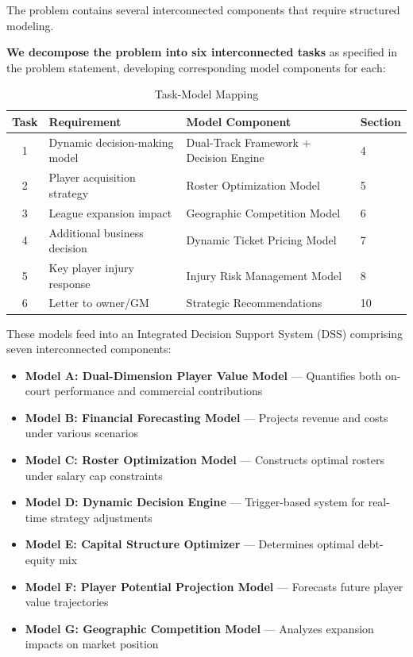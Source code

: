 \documentclass{mcmthesis}
\begin{document}
The problem contains several interconnected components that require structured modeling.

\textbf{We decompose the problem into six interconnected tasks} as specified in the problem statement, developing corresponding model components for each:

\begin{table}[H]
\centering
\caption{Task-Model Mapping}
\begin{tabular}{clll}
\toprule
\textbf{Task} & \textbf{Requirement} & \textbf{Model Component} & \textbf{Section} \\
\midrule
1 & Dynamic decision-making model & Dual-Track Framework + Decision Engine & 4 \\
2 & Player acquisition strategy & Roster Optimization Model & 5 \\
3 & League expansion impact & Geographic Competition Model & 6 \\
4 & Additional business decision & Dynamic Ticket Pricing Model & 7 \\
5 & Key player injury response & Injury Risk Management Model & 8 \\
6 & Letter to owner/GM & Strategic Recommendations & 10 \\
\bottomrule
\end{tabular}
\end{table}

These models feed into an Integrated Decision Support System (DSS) comprising seven interconnected components:

\begin{itemize}
\item \textbf{Model A: Dual-Dimension Player Value Model} --- Quantifies both on-court performance and commercial contributions
\item \textbf{Model B: Financial Forecasting Model} --- Projects revenue and costs under various scenarios
\item \textbf{Model C: Roster Optimization Model} --- Constructs optimal rosters under salary cap constraints
\item \textbf{Model D: Dynamic Decision Engine} --- Trigger-based system for real-time strategy adjustments
\item \textbf{Model E: Capital Structure Optimizer} --- Determines optimal debt-equity mix
\item \textbf{Model F: Player Potential Projection Model} --- Forecasts future player value trajectories
\item \textbf{Model G: Geographic Competition Model} --- Analyzes expansion impacts on market position
\end{itemize}
\end{document}
